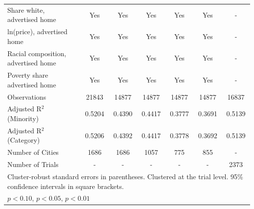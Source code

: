 \begin{table}[htbp]
{\begin{tabular}{l*{6}{c}}
\midrule
Share white, advertised home  & Yes & Yes & Yes & Yes & Yes & - \\
ln(price), advertised home  & Yes & Yes & Yes & Yes & Yes & - \\
Racial composition, advertised home & Yes & Yes & Yes & Yes & Yes & - \\
Poverty share advertised home & Yes & Yes & Yes & Yes & Yes & - \\
Observations & 21843 & 14877 & 14877 & 14877 & 14877 & 16837 \\
Adjusted R$^2$ (Minority) & 0.5204 & 0.4390 & 0.4417 & 0.3777 & 0.3691 & 0.5139 \\
Adjusted R$^2$ (Category) & 0.5206 & 0.4392 & 0.4417 & 0.3778 & 0.3692 & 0.5139 \\
Number of Cities & 1686 & 1686 & 1057 & 775 & 855 & - \\
Number of Trials & - & - & - & - & - & 2373 \\
\bottomrule
\multicolumn{7}{l}{\footnotesize Cluster-robust standard errors in parentheses. Clustered at the trial level. 95\% confidence intervals in square brackets.}\\
\multicolumn{7}{l}{\footnotesize \sym{*} \(p<0.10\), \sym{**} \(p<0.05\), \sym{***} \(p<0.01\)}\\
\end{tabular}
}
\end{table}
